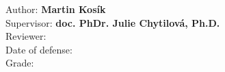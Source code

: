 \pagestyle{empty}

\vfill

\vglue 16cm

\noindent \large{Author: \textbf{Martin Kosík }}\\
\noindent \large{Supervisor: \textbf{doc. PhDr. Julie Chytilová, Ph.D.}}\\
\noindent \large{Reviewer: \textbf{}}\\
\noindent \large{Date of defense:}
\normalsize{}\\
\newline
\noindent \large{Grade:} \normalsize{}\\

